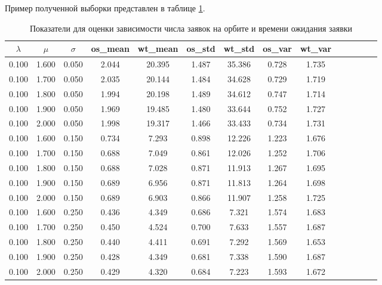 Пример полученной выборки представлен в таблице \ref{sim_result_1}.

\begin{table}[H] 
	\centering
	\caption{Показатели для оценки зависимости числа заявок на орбите и времени ожидания заявки}
	\label{sim_result_1}
\begin{tabular}{|c|c|c|c|c|c|c|c|c|c|c|c|c|c|} 
\hline
$\lambda$ & $\mu$   &  $\sigma$ &  os\_mean &   wt\_mean &      os\_std &     wt\_std &       os\_var &     wt\_var \\
\hline
0.100 &           1.600 &           0.050 &    2.044 &   20.395 &   1.487 &  35.386 &   0.728 &   1.735 \\
\hline
0.100 &           1.700 &           0.050 &    2.035 &   20.144 &   1.484 &  34.628 &   0.729 &   1.719 \\
\hline
0.100 &           1.800 &           0.050 &    1.994 &   20.198 &   1.489 &  34.612 &   0.747 &   1.714 \\
\hline
0.100 &           1.900 &           0.050 &    1.969 &   19.485 &   1.480 &  33.644 &   0.752 &   1.727 \\
\hline
0.100 &           2.000 &           0.050 &    1.998 &   19.317 &   1.466 &  33.433 &   0.734 &   1.731 \\
\hline
0.100 &           1.600 &           0.150 &    0.734 &    7.293 &   0.898 &  12.226 &   1.223 &   1.676 \\
\hline
0.100 &           1.700 &           0.150 &    0.688 &    7.049 &   0.861 &  12.026 &   1.252 &   1.706 \\
\hline
0.100 &           1.800 &           0.150 &    0.688 &    7.028 &   0.871 &  11.913 &   1.267 &   1.695 \\
\hline
0.100 &           1.900 &           0.150 &    0.689 &    6.956 &   0.871 &  11.813 &   1.264 &   1.698 \\
\hline
0.100 &           2.000 &           0.150 &    0.689 &    6.903 &   0.866 &  11.907 &   1.258 &   1.725 \\
\hline
0.100 &           1.600 &           0.250 &    0.436 &    4.349 &   0.686 &   7.321 &   1.574 &   1.683 \\
\hline
0.100 &           1.700 &           0.250 &    0.450 &    4.524 &   0.700 &   7.633 &   1.557 &   1.687 \\
\hline
0.100 &           1.800 &           0.250 &    0.440 &    4.411 &   0.691 &   7.292 &   1.569 &   1.653 \\
\hline
0.100 &           1.900 &           0.250 &    0.428 &    4.349 &   0.681 &   7.338 &   1.590 &   1.687 \\
\hline
0.100 &           2.000 &           0.250 &    0.429 &    4.320 &   0.684 &   7.223 &   1.593 &   1.672 \\
\hline
\end{tabular}
\end{table}

